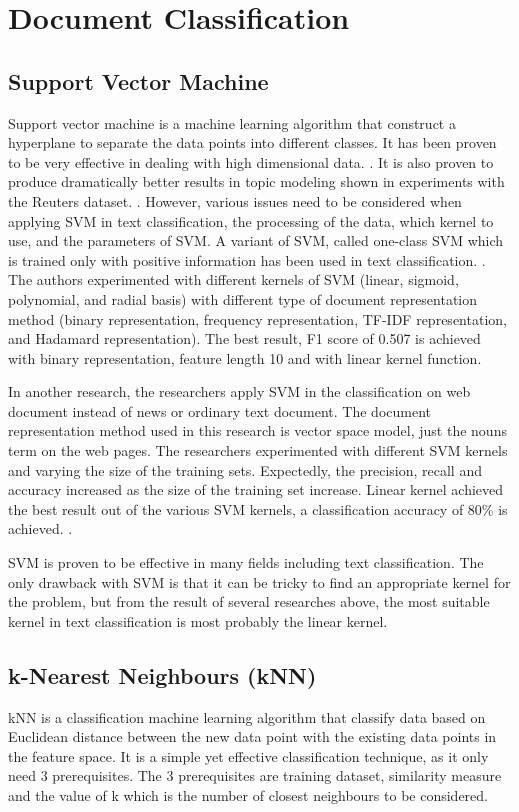 \clearpage	
\section{Document Classification}
\subsection{Support Vector Machine}
Support vector machine is a machine learning algorithm that construct a hyperplane to separate the data points into different classes. It has been proven to be very effective in dealing with high dimensional data. \cite{webSvm}. It is also proven to produce dramatically better results in topic modeling shown in experiments with the Reuters dataset. \cite{inductiveText}. However, various issues need to be considered when applying SVM in text classification, the processing of the data, which kernel to use, and the parameters of SVM. A variant of SVM, called one-class SVM which is trained only with positive information has been used in text classification. \cite{oneSvm}.  The authors experimented with different kernels of SVM (linear, sigmoid, polynomial, and radial basis) with different type of document representation method (binary representation, frequency representation, TF-IDF representation, and Hadamard representation). The best result, F1 score of 0.507 is achieved with binary representation, feature length 10 and with linear kernel function.  
	
In another research, the researchers apply SVM in the classification on web document instead of news or ordinary text document. The document representation method used in this research is vector space model, just the nouns term on the web pages. The researchers experimented with different SVM kernels and varying the size of the training sets. Expectedly, the precision, recall and accuracy increased as the size of the training set increase. Linear kernel achieved the best result out of the various SVM kernels, a classification accuracy of 80\% is achieved. \cite{webSvm}.
	
SVM is proven to be effective in many fields including text classification. The only drawback with SVM is that it can be tricky to find an appropriate kernel for the problem, but from the result of several researches above, the most suitable kernel in text classification is most probably the linear kernel.\\


\subsection{k-Nearest Neighbours (kNN)}
kNN is a classification machine learning algorithm that classify data based on Euclidean distance between the new data point with the existing data points in the feature space. It is a simple yet effective classification technique, as it only need 3 prerequisites. The 3 prerequisites are training dataset, similarity measure and the value of k which is the number of closest neighbours to be considered. 

